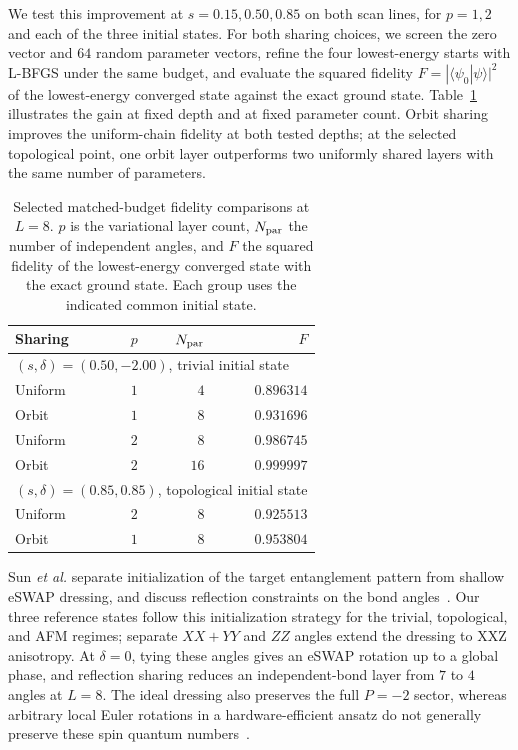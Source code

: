 We test this improvement at $s=0.15,0.50,0.85$ on both scan lines, for $p=1,2$ and each of the three initial states.
For both sharing choices, we screen the zero vector and $64$ random parameter vectors, refine the four lowest-energy starts with L-BFGS under the same budget, and evaluate the squared fidelity $F=|\langle\psi_0|\psi\rangle|^2$ of the lowest-energy converged state against the exact ground state.
Table~\ref{tab:ansatz-fidelity} illustrates the gain at fixed depth and at fixed parameter count.
Orbit sharing improves the uniform-chain fidelity at both tested depths; at the selected topological point, one orbit layer outperforms two uniformly shared layers with the same number of parameters.

\begin{table}[htbp]
\caption{Selected matched-budget fidelity comparisons at $L=8$.
$p$ is the variational layer count, $N_{\rm par}$ the number of independent angles, and $F$ the squared fidelity of the lowest-energy converged state with the exact ground state.
Each group uses the indicated common initial state.}
\label{tab:ansatz-fidelity}
\begin{ruledtabular}
\begin{tabular}{lrrr}
Sharing & $p$ & $N_{\rm par}$ & $F$ \\
\hline
\multicolumn{4}{l}{$(s,\delta)=(0.50,-2.00)$, trivial initial state} \\
Uniform & $1$ & $4$ & $0.896314$ \\
Orbit & $1$ & $8$ & $0.931696$ \\
Uniform & $2$ & $8$ & $0.986745$ \\
Orbit & $2$ & $16$ & $0.999997$ \\
\hline
\multicolumn{4}{l}{$(s,\delta)=(0.85,0.85)$, topological initial state} \\
Uniform & $2$ & $8$ & $0.925513$ \\
Orbit & $1$ & $8$ & $0.953804$
\end{tabular}
\end{ruledtabular}
\end{table}

Sun \textit{et al.} separate initialization of the target entanglement pattern from shallow eSWAP dressing, and discuss reflection constraints on the bond angles~\cite{sun2023efficient}.
Our three reference states follow this initialization strategy for the trivial, topological, and AFM regimes; separate $XX{+}YY$ and $ZZ$ angles extend the dressing to XXZ anisotropy.
At $\delta=0$, tying these angles gives an eSWAP rotation up to a global phase, and reflection sharing reduces an independent-bond layer from $7$ to $4$ angles at $L=8$.
The ideal dressing also preserves the full $P=-2$ sector, whereas arbitrary local Euler rotations in a hardware-efficient ansatz do not generally preserve these spin quantum numbers~\cite{kandala2017hardware}.

